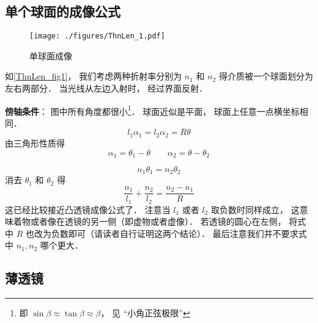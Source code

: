 


\subsection{单个球面的成像公式}
\begin{figure}[ht]
\centering
\texttt{[image: ./figures/ThnLen\_1.pdf]}
\caption{单球面成像} \label{ThnLen_fig1}
\end{figure}

如\autoref{ThnLen_fig1}， 我们考虑两种折射率分别为 $n_1$ 和 $n_2$ 得介质被一个球面划分为左右两部分． 当光线从左边入射时， 经过界面反射．

\textbf{傍轴条件}： 图中所有角度都很小\footnote{即 $\sin\beta \approx \tan\beta \approx \beta$， 见 “小角正弦极限”}． 球面近似是平面， 球面上任意一点横坐标相同．
\begin{equation}
l_1 \alpha_1 = l_2 \alpha_2 = R\theta
\end{equation}
由三角形性质得
\begin{equation}
\alpha_1 = \theta_1 - \theta \qquad
\alpha_2 = \theta - \theta_2
\end{equation}

\begin{equation}
n_1 \theta_1 = n_2 \theta_2
\end{equation}
消去 $\theta_1$ 和 $\theta_2$ 得
\begin{equation}
\frac{n_1}{l_1} + \frac{n_2}{l_2} = \frac{n_2 - n_1}{R}
\end{equation}
这已经比较接近凸透镜成像公式了． 注意当 $l_1$ 或者 $l_2$ 取负数时同样成立， 这意味着物或者像在透镜的另一侧（即虚物或者虚像）． 若透镜的圆心在左侧， 将式中 $R$ 也改为负数即可（请读者自行证明这两个结论）． 最后注意我们并不要求式中 $n_1, n_2$ 哪个更大．

\subsection{薄透镜}

